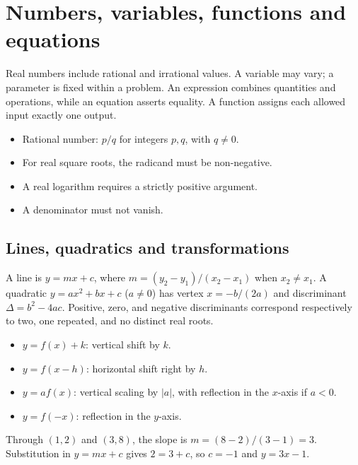 \documentclass[12pt,a4paper]{article}
\begin{document}
\section{Numbers, variables, functions and equations}
Real numbers include rational and irrational values. A variable may vary; a parameter is fixed within a problem. An expression combines quantities and operations, while an equation asserts equality. A function assigns each allowed input exactly one output.
\begin{itemize}
\item Rational number: $p/q$ for integers $p,q$, with $q\ne0$.
\item For real square roots, the radicand must be non-negative.
\item A real logarithm requires a strictly positive argument.
\item A denominator must not vanish.
\end{itemize}
\subsection{Lines, quadratics and transformations}
A line is $y=mx+c$, where $m=(y_2-y_1)/(x_2-x_1)$ when $x_2\ne x_1$. A quadratic $y=ax^2+bx+c$ ($a\ne0$) has vertex $x=-b/(2a)$ and discriminant $\Delta=b^2-4ac$. Positive, zero, and negative discriminants correspond respectively to two, one repeated, and no distinct real roots.
\begin{itemize}
\item $y=f(x)+k$: vertical shift by $k$.
\item $y=f(x-h)$: horizontal shift right by $h$.
\item $y=af(x)$: vertical scaling by $|a|$, with reflection in the $x$-axis if $a<0$.
\item $y=f(-x)$: reflection in the $y$-axis.
\end{itemize}
\begin{exampleBox}Through $(1,2)$ and $(3,8)$, the slope is $m=(8-2)/(3-1)=3$. Substitution in $y=mx+c$ gives $2=3+c$, so $c=-1$ and $\boxed{y=3x-1}$.
\end{exampleBox}
\begin{center}\end{center}
\end{document}
